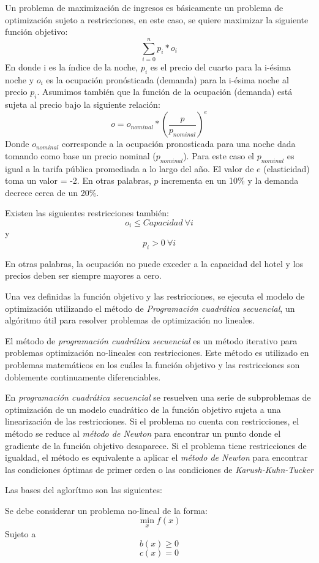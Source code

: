 Un problema de maximización de ingresos es básicamente un problema de optimización sujeto a restricciones, en este caso, se quiere maximizar la siguiente función objetivo:
$$\sum_{i=0}^{n}p_i*o_i$$
En donde i es la índice de la noche, $p_i$ es el precio del cuarto para la i-ésima noche y $o_i$ es la ocupación pronósticada (demanda) para la i-ésima noche al precio $p_i$. Asumimos también que la función de la ocupación (demanda) está sujeta al precio bajo la siguiente relación:
$$o = o_{nominal} * (\frac{p}{p_{nominal}})^e$$
Donde $o_{nominal}$ corresponde a la ocupación pronosticada para una noche dada tomando como base un precio nominal ($p_{nominal}$). Para este caso el $p_{nominal}$ es igual a la tarifa pública promediada a lo largo del año. El valor de $e$ (elasticidad) toma un valor = -2. En otras palabras, $p$ incrementa en un 10\% y la demanda decrece cerca de un 20\%.

Existen las siguientes restricciones también: $$o_i \leq Capacidad\ \forall i$$ y $$p_i > 0\ \forall i$$

En otras palabras, la ocupación no puede exceder a la capacidad del hotel y los precios deben ser siempre mayores a cero.

Una vez definidas la función objetivo y las restricciones, se ejecuta el modelo de optimización utilizando el método de \emph{Programación cuadrática secuencial}, un algóritmo útil para resolver problemas de optimización no lineales.

El método de \emph{programación cuadrática secuencial} es un método iterativo para problemas optimización no-lineales con restricciones. Este método es utilizado en problemas matemáticos en los cuáles la función objetivo y las restricciones son doblemente continuamente diferenciables.

En \emph{programación cuadrática secuencial} se resuelven una serie de subproblemas de optimización de un modelo cuadrático de la función objetivo sujeta a una linearización de las restricciones. Si el problema no cuenta con restricciones, el método se reduce al \emph{método de Newton} para encontrar un punto donde el gradiente de la función objetivo desaparece. Si el problema tiene restricciones de igualdad, el método es equivalente a aplicar el \emph{método de Newton} para encontrar las condiciones óptimas de primer orden o las condiciones de \emph{Karush-Kuhn-Tucker}

Las bases del aglorítmo son las siguientes:

Se debe considerar un problema no-lineal de la forma: $$\min_x f(x)$$ Sujeto a $$b(x) \geq 0$$ $$c(x) = 0$$

